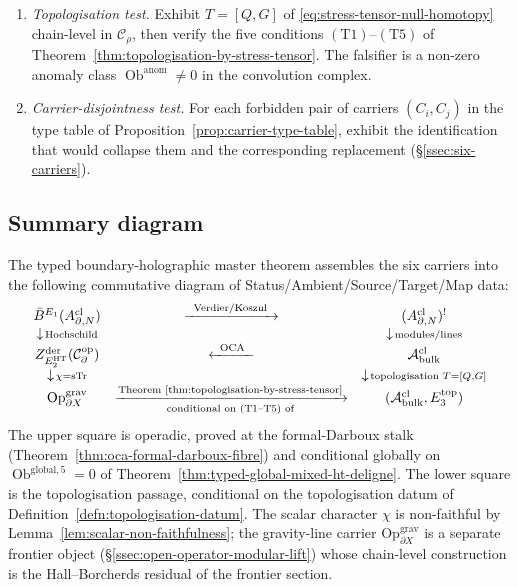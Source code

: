 \begin{enumerate}[label=\textup{(V\arabic*)}]
        \(\operatorname{Ob}^{\mathrm{global,5}}\).
  \item \emph{Topologisation test.}  Exhibit \(T=[Q,G]\) of
        \eqref{eq:stress-tensor-null-homotopy} chain-level in
        \(\mathcal C_\rho\), then verify the five conditions
        \((\mathrm{T1})\)--\((\mathrm{T5})\) of
        Theorem~\ref{thm:topologisation-by-stress-tensor}.  The
        falsifier is a non-zero anomaly class
        \(\operatorname{Ob}^{\mathrm{anom}}\neq 0\) in the
        convolution complex.
  \item \emph{Carrier-disjointness test.}  For each forbidden pair of
        carriers \((C_i,C_j)\) in the type table of
        Proposition~\ref{prop:carrier-type-table}, exhibit the
        identification that would collapse them and the corresponding
        replacement (\S\ref{ssec:six-carriers}).
\end{enumerate}

\subsection{Summary diagram}
\label{ssec:typed-summary-diagram}

The typed boundary-holographic master theorem assembles the six
carriers into the following commutative diagram of
Status/Ambient/Source/Target/Map data:
\[
  \begin{array}{ccc}
    \bar B^{E_1}(A^{\mathrm{cl}}_{\partial,N})
       & \xrightarrow{\;\;\mathrm{Verdier/Koszul}\;\;}
       & (A^{\mathrm{cl}}_{\partial,N})^!\\
    \downarrow\!{\scriptstyle \mathrm{Hochschild}}
       & & \downarrow\!{\scriptstyle \mathrm{modules/lines}}\\
    Z^{\mathrm{der}}_{E_2^{\mathrm{HT}}}(\mathcal C^{\mathrm{op}}_\partial)
       & \xleftarrow{\;\;\mathrm{OCA}\;\;}
       & \mathcal A^{\mathrm{cl}}_{\mathrm{bulk}}\\
    \downarrow\!{\scriptstyle \chi=\operatorname{sTr}}
       & & \downarrow\!{\scriptstyle \text{topologisation }T=[Q,G]}\\
    \mathrm{Op}^{\mathrm{grav}}_{\partial X}
       & \xrightarrow[\text{conditional on (T1--T5) of}]
                     {\text{Theorem~\ref{thm:topologisation-by-stress-tensor}}}
       & (\mathcal A^{\mathrm{cl}}_{\mathrm{bulk}},
          E_3^{\mathrm{top}})
  \end{array}
\]
The upper square is operadic, proved at the formal-Darboux stalk
(Theorem~\ref{thm:oca-formal-darboux-fibre}) and conditional globally
on \(\operatorname{Ob}^{\mathrm{global,5}}=0\) of
Theorem~\ref{thm:typed-global-mixed-ht-deligne}.  The lower square is
the topologisation passage, conditional on the topologisation datum
of Definition~\ref{defn:topologisation-datum}.  The scalar character
\(\chi\) is non-faithful by
Lemma~\ref{lem:scalar-non-faithfulness}; the gravity-line carrier
\(\mathrm{Op}^{\mathrm{grav}}_{\partial X}\) is a separate frontier
object (\S\ref{ssec:open-operator-modular-lift}) whose chain-level
construction is the Hall--Borcherds residual of the frontier section.

